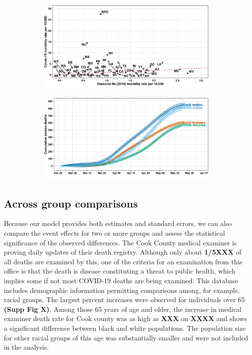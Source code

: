 \documentclass[11pt]{article}
\begin{document}
\begin{figure}[ht]
	\hfill
	\begin{subfigure}[t]{0.49\linewidth}
		\centering
		\includegraphics[width=1\linewidth]{figs/figure-2c.pdf}
		\caption{} 
		\label{fig:excess-flu-vs-covid}
	\end{subfigure}
	\hfill
	\begin{subfigure}[t]{0.49\linewidth}
		\centering
		\includegraphics[width=1\linewidth]{figs/figure-2d.pdf}
		\caption{} 
		\label{fig:excess-cook}
	\end{subfigure}
	\caption{}
	\label{fig:excess-deaths}
\end{figure}

\subsection{Across group comparisons}
\label{subsec:group-comparison}
Because our model provides both estimates and standard errors, we can also compare the event effects for two or more groups and assess the statistical significance of the observed differences. The Cook County medical examiner is proving daily updates of their death registry. Although only about \textbf{1/5XXX} of all deaths are examined by this, one of the criteria for an examination from this office is that the death is disease constituting a threat to public health, which implies some if not most COVID-19 deaths are being examined. This database includes demographic information permitting comparisons among, for example, racial groups. The largest percent increases were observed for individuals over 65 \textbf{(Supp Fig X)}. Among those 65 years of age and older, the increase in medical examiner death rate for Cook county was as high as \textbf{XXX} on \textbf{XXXX} and shows a significant difference between black and white populations. The population size for other racial groups of this age was substantially smaller and were not included in the analysis.
 
\end{document}
